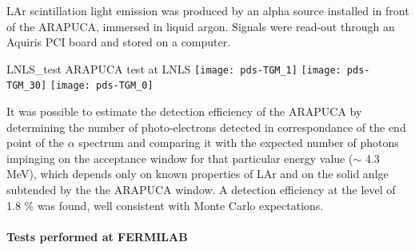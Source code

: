 LAr scintillation light emission was produced by an alpha source installed in front of the ARAPUCA, immersed in liquid argon. Signals were read-out through an Aquiris PCI board and stored on a computer.

\begin{dunefigure}{LNLS_test}
{ARAPUCA test at LNLS} 
	\texttt{[image: pds-TGM\_1]} \quad
	\texttt{[image: pds-TGM\_30]}\quad
	\texttt{[image: pds-TGM\_0]}
\end{dunefigure}

It was possible to estimate the detection efficiency of the ARAPUCA by 
determining the number of photo-electrons detected in correspondance of the end point of the $\alpha$ spectrum 
and comparing it with the expected number of photons impinging on the acceptance window for that 
particular energy value ($\sim$ 4.3 MeV), which depends only on known properties of LAr and on the solid 
anlge subtended by the the ARAPUCA window. A detection efficiency at the level of 1.8 \% 
was found, well consistent with Monte Carlo expectations.

\paragraph*{Tests performed at FERMILAB}
\label{subsec:test_fnal}


